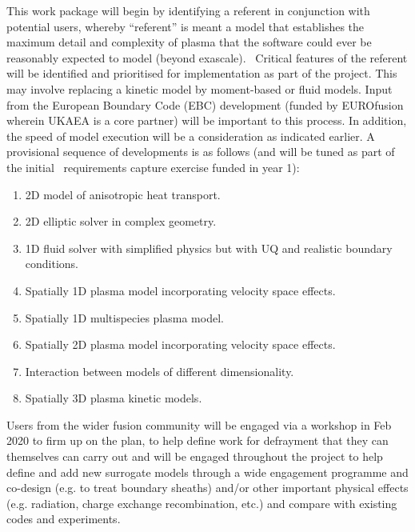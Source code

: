 \documentclass[a4paper]{article}
\newcommand\liststyleWWNumx{%
\renewcommand\theenumi{\arabic{enumi}}
\renewcommand\theenumii{\alph{enumii}}
\renewcommand\theenumiii{\roman{enumiii}}
\renewcommand\theenumiv{\arabic{enumiv}}
\renewcommand\labelenumi{\theenumi.}
\renewcommand\labelenumii{\theenumii.}
\renewcommand\labelenumiii{\theenumiii.}
\renewcommand\labelenumiv{\theenumiv.}
}
\begin{document}
\bigskip

This work package will begin by identifying a referent in conjunction with 
potential users, whereby ``referent'' is
meant a model that establishes the maximum detail and complexity of plasma that 
the software could ever be reasonably
expected to model (beyond exascale). \ Critical features of the referent will 
be identified and prioritised for
implementation as part of the project. This may involve replacing a kinetic 
model by moment-based or fluid models.
Input from the European Boundary Code (EBC) development (funded by EUROfusion 
wherein UKAEA is a core partner) will be
important to this process. In addition, the speed of model execution will be a 
consideration as indicated earlier. A
provisional sequence of developments is as follows (and will be tuned as part 
of the initial \nep \  requirements
capture exercise funded in year 1):


\bigskip

\liststyleWWNumx
\begin{enumerate}
\item 2D model of anisotropic heat transport.
\item 2D elliptic solver in complex geometry.
\item 1D fluid solver with simplified physics but with UQ and realistic 
boundary conditions.
\item Spatially 1D plasma model incorporating velocity space effects.
\item Spatially 1D multispecies plasma model.
\item Spatially 2D plasma model incorporating velocity space effects.
\item Interaction between models of different dimensionality.
\item Spatially 3D plasma kinetic models.
\end{enumerate}

\bigskip

Users from the wider fusion community will be engaged via a workshop in Feb 
2020 to firm up on the plan, to help define
work for defrayment that they can themselves can carry out and will be engaged 
throughout the project to help define
and add new surrogate models through a wide engagement programme and co-design 
(e.g. to treat boundary sheaths) and/or
other important physical effects (e.g. radiation, charge exchange 
recombination, etc.) and compare with existing codes
and experiments. 

\subsection[]{\rmfamily\bfseries }
\end{document}
